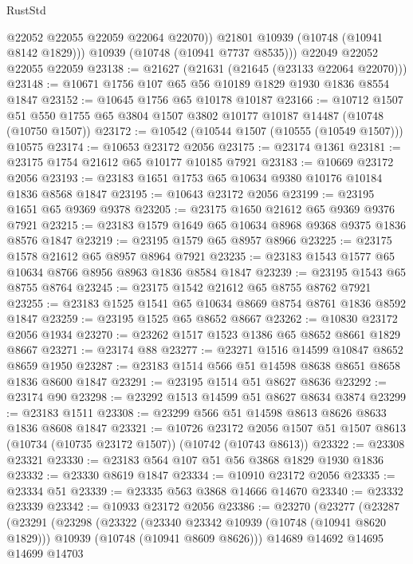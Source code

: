 \begin{lexlean}{RustStd}
\begin{coremodule}
            @22052
            @22055
            @22059
            @22064
            @22070))
        @21801
        @10939
        (@10748 (@10941 @8142 @1829)))
      @10939
      (@10748 (@10941 @7737 @8535)))
    @22049
    @22052
    @22055
    @22059
@23138 := @21627 (@21631 (@21645 (@23133 @22064 @22070)))
@23148 := @10671 @1756 @107 @65 @56 @10189 @1829 @1930 @1836 @8554 @1847
@23152 := @10645 @1756 @65 @10178 @10187
@23166 := @10712
    @1507
    @51
    @550
    @1755
    @65
    @3804
    @1507
    @3802
    @10177
    @10187
    @14487
    (@10748 (@10750 @1507))
@23172 := @10542 (@10544 @1507 (@10555 (@10549 @1507))) @10575
@23174 := @10653 @23172 @2056
@23175 := @23174 @1361
@23181 := @23175 @1754 @21612 @65 @10177 @10185 @7921
@23183 := @10669 @23172 @2056
@23193 := @23183 @1651 @1753 @65 @10634 @9380 @10176 @10184 @1836 @8568 @1847
@23195 := @10643 @23172 @2056
@23199 := @23195 @1651 @65 @9369 @9378
@23205 := @23175 @1650 @21612 @65 @9369 @9376 @7921
@23215 := @23183 @1579 @1649 @65 @10634 @8968 @9368 @9375 @1836 @8576 @1847
@23219 := @23195 @1579 @65 @8957 @8966
@23225 := @23175 @1578 @21612 @65 @8957 @8964 @7921
@23235 := @23183 @1543 @1577 @65 @10634 @8766 @8956 @8963 @1836 @8584 @1847
@23239 := @23195 @1543 @65 @8755 @8764
@23245 := @23175 @1542 @21612 @65 @8755 @8762 @7921
@23255 := @23183 @1525 @1541 @65 @10634 @8669 @8754 @8761 @1836 @8592 @1847
@23259 := @23195 @1525 @65 @8652 @8667
@23262 := @10830 @23172 @2056 @1934
@23270 := @23262 @1517 @1523 @1386 @65 @8652 @8661 @1829 @8667
@23271 := @23174 @88
@23277 := @23271 @1516 @14599 @10847 @8652 @8659 @1950
@23287 := @23183 @1514 @566 @51 @14598 @8638 @8651 @8658 @1836 @8600 @1847
@23291 := @23195 @1514 @51 @8627 @8636
@23292 := @23174 @90
@23298 := @23292 @1513 @14599 @51 @8627 @8634 @3874
@23299 := @23183 @1511
@23308 := @23299 @566 @51 @14598 @8613 @8626 @8633 @1836 @8608 @1847
@23321 := @10726
    @23172
    @2056
    @1507
    @51
    @1507
    @8613
    (@10734 (@10735 @23172 @1507))
    (@10742 (@10743 @8613))
@23322 := @23308 @23321
@23330 := @23183 @564 @107 @51 @56 @3868 @1829 @1930 @1836
@23332 := @23330 @8619 @1847
@23334 := @10910 @23172 @2056
@23335 := @23334 @51
@23339 := @23335 @563 @3868 @14666 @14670
@23340 := @23332 @23339
@23342 := @10933 @23172 @2056
@23386 := @23270
    (@23277
      (@23287
        (@23291
          (@23298
            (@23322
              (@23340 @23342 @10939 (@10748 (@10941 @8620 @1829)))
              @10939
              (@10748 (@10941 @8609 @8626)))
            @14689
            @14692
            @14695
            @14699
            @14703

\end{coremodule}
\end{lexlean}

